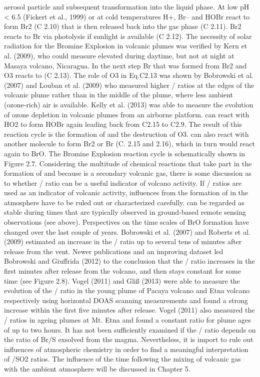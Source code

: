 \documentclass  [
  paper    = a4,
  BCOR     = 10mm,
  twoside,
  fontsize = 12pt,
  fleqn,
  toc      = bibnumbered,
  toc      = listofnumbered,
  numbers  = noendperiod,
  headings = normal,
  listof   = leveldown,
  version  = 3.03
]                                       {scrreprt}
\begin{document}
{	aerosol particle and subsequent transformation into the liquid phase. At low pH
	< 6.5 (Fickert et al., 1999) or at cold temperatures H+, Br– and HOBr react to
	form Br2 (C 2.10) that is then released back into the gas phase (C 2.11). Br2
	reacts to Br via photolysis if sunlight is available (C 2.12). The necessity of solar
	radiation for the Bromine Explosion in volcanic plumes was verified by Kern et al.
	(2009), who could measure elevated  during daytime, but not at night at
	Masaya volcano, Nicaragua. In the next step Br that was formed from Br2 and
	O3 reacts to  (C 2.13). The role of O3 in Eq.C2.13 was shown by Bobrowski
	et al. (2007) and Louban et al. (2009) who measured higher / ratios at
	the edges of the volcanic plume rather than in the middle of the plume, where
	less ambient (ozone-rich) air is available. Kelly et al. (2013) was able to measure
	the evolution of ozone depletion in volcanic plumes from an airborne platform.
	 can react with HO2 to form HOBr again leading back from C2.15 to C2.9.
	The result of this reaction cycle is the formation of  and the destruction of
	O3.  can also react with another  molecule to form Br2 or Br (C. 2.15
	and 2.16), which in turn would react again to BrO. The Bromine Explosion
	reaction cycle is schematically shown in Figure 2.7.
	Considering the multitude of chemical reactions that take part in the formation
	of  and because  is a secondary volcanic gas, there is some discussion as to
	whether / ratio can be a useful indicator of volcano activity. If / ratios are used as an indicator of volcanic activity, influences from the formation
	of  in the atmosphere have to be ruled out or characterized carefully.  can
	be regarded as stable during times that are typically observed in ground-based
	remote sensing observations (see above). Perspectives on the time scales of BrO
	formation have changed over the last couple of years. Bobrowski et al. (2007)
	and Roberts et al. (2009) estimated an increase in the / ratio up to
	several tens of minutes after release from the vent. Newer publications and an
	improving dataset led Bobrowski and Giuffrida (2012) to the conclusion that the
	/ ratio increases in the first minutes after release from the volcano, and
	then stays constant for some time (see Figure 2.8). Vogel (2011) and Gliß (2013)
	were able to measure the evolution of the / ratio in the young plume of
	Pacaya volcano and Etna volcano respectively using horizontal DOAS scanning
	measurements and found a strong increase within the first five minutes after
	release. Vogel (2011) also measured the / ratios in ageing plumes at Mt.
	Etna and found a constant ratio for plume ages of up to two hours. It has not
	been sufficiently examined if the / ratio depends on the ratio of Br/S
	exsolved from the magma. Nevertheless, it is import to rule out influences of
	atmospheric chemistry in order to find a meaningful interpretation of /SO2
	ratios. The influence of the time following the mixing of volcanic gas with the
	ambient atmosphere will be discussed in Chapter 5.
}
\end{document}
